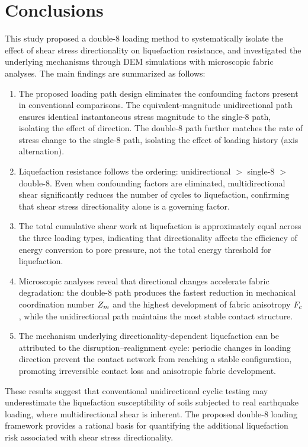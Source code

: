 \section{Conclusions}
\label{sec:conclusions}

This study proposed a double-8 loading method to systematically isolate the effect of shear stress directionality on liquefaction resistance, and investigated the underlying mechanisms through DEM simulations with microscopic fabric analyses. The main findings are summarized as follows:

\begin{enumerate}
  \item The proposed loading path design eliminates the confounding factors present in conventional comparisons. The equivalent-magnitude unidirectional path ensures identical instantaneous stress magnitude to the single-8 path, isolating the effect of direction. The double-8 path further matches the rate of stress change to the single-8 path, isolating the effect of loading history (axis alternation).

  \item Liquefaction resistance follows the ordering: unidirectional $>$ single-8 $>$ double-8. Even when confounding factors are eliminated, multidirectional shear significantly reduces the number of cycles to liquefaction, confirming that shear stress directionality alone is a governing factor.

  \item The total cumulative shear work at liquefaction is approximately equal across the three loading types, indicating that directionality affects the efficiency of energy conversion to pore pressure, not the total energy threshold for liquefaction.

  \item Microscopic analyses reveal that directional changes accelerate fabric degradation: the double-8 path produces the fastest reduction in mechanical coordination number $Z_m$ and the highest development of fabric anisotropy $F_c$, while the unidirectional path maintains the most stable contact structure.

  \item The mechanism underlying directionality-dependent liquefaction can be attributed to the disruption--realignment cycle: periodic changes in loading direction prevent the contact network from reaching a stable configuration, promoting irreversible contact loss and anisotropic fabric development.
\end{enumerate}

These results suggest that conventional unidirectional cyclic testing may underestimate the liquefaction susceptibility of soils subjected to real earthquake loading, where multidirectional shear is inherent. The proposed double-8 loading framework provides a rational basis for quantifying the additional liquefaction risk associated with shear stress directionality.
